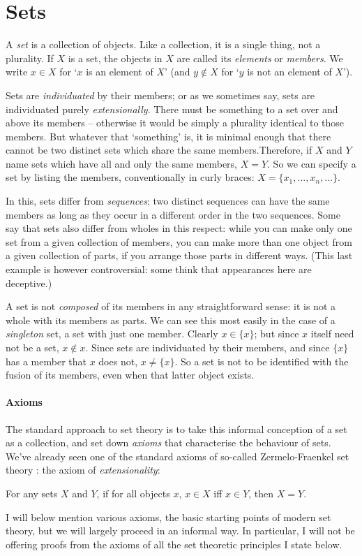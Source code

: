 
\section{Sets}

A \emph{set} is a collection of objects. Like a collection, it is a single thing, not a plurality. If $X$ is a set, the objects in $X$ are called its \emph{elements} or \emph{members}. We write $x \in X$ for `$x$ is an element of $X$' (and $y \notin X$ for `$y$ is not an element of $X$').

 Sets are \emph{individuated} by their members; or as we sometimes say, sets are individuated purely \emph{extensionally}. There must be something to a set over and above its members – otherwise it would be simply a plurality identical to those members. But whatever that ‘something’ is, it is minimal enough that there cannot be two distinct sets which share the same members.Therefore, if $X$ and $Y$ name sets which have all and only the same members, $X = Y$. So we can specify a set by listing the members, conventionally in curly braces: $X = \{x_{1},...,x_{n},…\}$. 

 In this, sets differ from \emph{sequences}: two distinct sequences can have the same members as long as they occur in a different order in the two sequences. Some say that sets also differ from wholes in this respect: while you can make only one set from a given collection of members, you can make more than one object from a given collection of parts, if you arrange those parts in different ways. (This last example is however controversial: some think that appearances here are deceptive.) 

A set is not \emph{composed} of its members in any straightforward sense: it is not a whole with its members as parts. We can see this most easily in the case of a \emph{singleton} set, a set with just one member. Clearly $x \in \{x\}$; but since $x$ itself need not be a set, $x \notin x$. Since sets are individuated by their members, and since $\{x\}$ has a member that $x$ does not, $x\neq\{x\}$. So a set is not to be identified with the fusion of its members, even when that latter object exists.

\paragraph{Axioms} The standard approach to set theory is to take this informal conception of a set as a collection, and set down \emph{axioms} that characterise the behaviour of sets. We've already seen one of the standard axioms of so-called Zermelo-Fraenkel set theory : the axiom of \emph{extensionality}: \begin{axiom}[Extensionality]
  For any sets $X$ and $Y$, if for all objects $x$, $x\in X$ iff $x\in Y$, then $X=Y$.
\end{axiom} I will below mention various axioms, the basic starting points of modern set theory, but we will largely proceed in an informal way. In particular, I will not be offering proofs from the axioms of all the set theoretic principles I state below.

